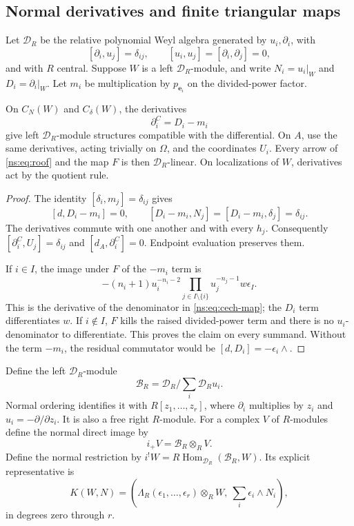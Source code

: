 \subsection{Normal derivatives and finite triangular maps}

Let \(\mathcal D_R\) be the relative polynomial Weyl algebra generated
by \(u_i,\partial_i\), with
\[
 [\partial_i,u_j]=\delta_{ij},\qquad
 [u_i,u_j]=[\partial_i,\partial_j]=0,
\]
and with \(R\) central.  Suppose \(W\) is a left
\(\mathcal D_R\)-module, and write \(N_i=u_i|_W\) and
\(D_i=\partial_i|_W\).  Let \(m_i\) be multiplication by
\(p_{\boldsymbol e_i}\) on the divided-power factor.

\begin{lemma}\label{ns:lem:derivative}
On \(C_N(W)\) and \(C_\delta(W)\), the derivatives
\begin{equation}\label{ns:eq:corrected-derivative}
 \partial_i^C=D_i-m_i
\end{equation}
give left \(\mathcal D_R\)-module structures compatible with the
differential.  On \(A\), use the same derivatives, acting trivially
on \(\Omega\), and the coordinates \(U_i\).
Every arrow of \eqref{ns:eq:roof} and the map \(F\) is then
\(\mathcal D_R\)-linear.  On localizations of \(W\), derivatives
act by the quotient rule.
\end{lemma}

\begin{proof}
The identity \([\delta_i,m_j]=\delta_{ij}\) gives
\[
 [d,D_i-m_i]=0,\qquad
 [D_i-m_i,N_j]=[D_i-m_i,\delta_j]=\delta_{ij}.
\]
The derivatives commute with one another and with every \(h_j\).
Consequently \([\partial_i^C,U_j]=\delta_{ij}\) and
\([d_A,\partial_i^C]=0\).  Endpoint evaluation preserves them.

If \(i\in I\), the image under \(F\) of the \(-m_i\) term is
\[
 -(n_i+1)u_i^{-n_i-2}
       \prod_{j\in I\setminus\{i\}}u_j^{-n_j-1}w\epsilon_I.
\]
This is the derivative of the denominator in
\eqref{ns:eq:cech-map}; the \(D_i\) term differentiates \(w\).
If \(i\notin I\), \(F\) kills the raised divided-power term and
there is no \(u_i\)-denominator to differentiate.  This proves the
claim on every summand.  Without the term \(-m_i\), the residual
commutator would be \([d,D_i]=-\epsilon_i\wedge\).
\end{proof}

Define the left \(\mathcal D_R\)-module
\[
 \mathcal B_R=\mathcal D_R\big/\sum_i\mathcal D_Ru_i.
\]
Normal ordering identifies it with \(R[z_1,\ldots,z_r]\), where
\(\partial_i\) multiplies by \(z_i\) and
\(u_i=-\partial/\partial z_i\).  It is also a free right
\(R\)-module.  For a complex \(V\) of \(R\)-modules define the
normal direct image by
\[
 i_+V=\mathcal B_R\otimes_R V.
\]
Define the normal restriction by
\(i^!W=R\operatorname{Hom}_{\mathcal D_R}(\mathcal B_R,W)\).
Its explicit representative is
\begin{equation}\label{ns:eq:normal-restriction}
 K(W,N)=\left(\Lambda_R(\epsilon_1,\ldots,\epsilon_r)
               \otimes_R W,\ \sum_i\epsilon_i\wedge N_i\right),
\end{equation}
in degrees zero through \(r\).

